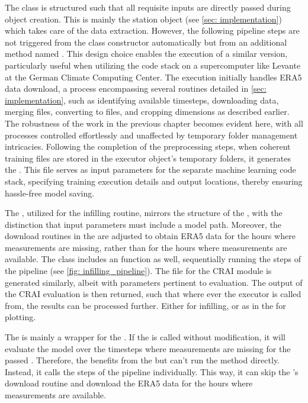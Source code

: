 The  class is structured such that all requisite inputs are directly passed during object creation. This is mainly the station object (see \autoref{sec: implementation}) which takes care of the data extraction. 
However, the following pipeline steps are not triggered from the class constructor automatically but from an additional method named .
This design choice enables the execution of a similar  version, particularly useful when utilizing the code stack on a supercomputer like Levante at the German Climate Computing Center.
The execution initially handles ERA5 data download, a process encompassing several routines detailed in \autoref{sec: implementation}, such as identifying available timesteps, downloading data, merging  files, converting to  files, and cropping dimensions as described earlier.
The robustness of the work in the previous chapter becomes evident here, with all processes controlled effortlessly and unaffected by temporary folder management intricacies.
Following the completion of the preprocessing steps, when coherent training files are stored in the executor object's temporary folders, it generates the .
This file serves as input parameters for the separate machine learning code stack, specifying training execution details and output locations, thereby ensuring hassle-free model saving.

The , utilized for the infilling routine, mirrors the structure of the , with the distinction that input parameters must include a model path.
Moreover, the download routines in the  are adjusted to obtain ERA5 data for the hours where measurements are missing, rather than for the hours where measurements are available.
The class includes an  function as well, sequentially running the steps of the pipeline (see \autoref{fig: infilling_pipeline}).
The  file for the CRAI module is generated similarly, albeit with parameters pertinent to evaluation.
The output of the CRAI evaluation is then returned, such that where ever the executor is called from, the results can be processed further.
Either for infilling, or as in the  for plotting. 

The  is mainly a wrapper for the . If the  is called without modification, it will evaluate the model over the timesteps where measurements are missing for the passed . Therefore, the  benefits from the  but can't run the  method directly. Instead, it calls the steps of the pipeline individually. This way, it can skip the 's download routine and download the ERA5 data for the hours where measurements are available.


